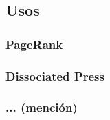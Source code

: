 \documentclass[../main.tex]{subfiles}
\begin{document}
\subsection{Usos}
\subsubsection{PageRank}
\subsubsection{Dissociated Press}
\subsubsection{... (mención)}
\end{document}
